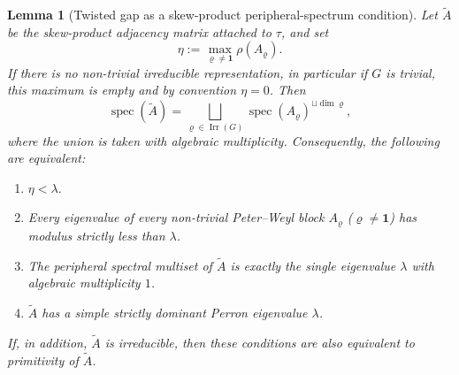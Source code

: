 \documentclass[11pt,a4paper]{amsart}
\theoremstyle{plain}
\newtheorem{lemma}[theorem]{Lemma}
\theoremstyle{definition}
\theoremstyle{remark}
\DeclareMathOperator{\spec}{spec}
\DeclareMathOperator{\Irr}{Irr}
\begin{document}
\begin{lemma}[Twisted gap as a skew-product peripheral-spectrum condition]
  \label{lem:twisted-gap-skew-product-peripheral}
  Let \(\widetilde A\) be the skew-product adjacency matrix attached to
  \(\tau\), and set
  \[
    \eta:=\max_{\varrho\neq\mathbf 1}\rho(A_\varrho).
  \]
  If there is no non-trivial irreducible representation, in particular
  if \(G\) is trivial, this maximum is empty and by convention
  \(\eta=0\).
  Then
  \[
    \spec(\widetilde A)
    =
    \bigsqcup_{\varrho\in\Irr(G)}
      \spec(A_\varrho)^{\sqcup \dim\varrho},
  \]
  where the union is taken with algebraic multiplicity. Consequently,
  the following are equivalent:
  \begin{enumerate}[label=\rm(\roman*)]
  \item \(\eta<\lambda\).
  \item Every eigenvalue of every non-trivial Peter--Weyl block
    \(A_\varrho\) (\(\varrho\neq\mathbf 1\)) has modulus strictly less
    than \(\lambda\).
  \item The peripheral spectral multiset of \(\widetilde A\) is exactly
    the single eigenvalue \(\lambda\) with algebraic multiplicity \(1\).
  \item \(\widetilde A\) has a simple strictly dominant Perron
    eigenvalue \(\lambda\).
  \end{enumerate}
  If, in addition, \(\widetilde A\) is irreducible, then these
  conditions are also equivalent to primitivity of \(\widetilde A\).
\end{lemma}
\end{document}
